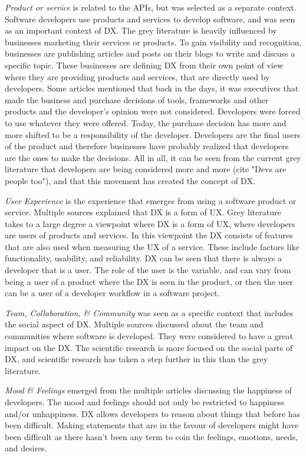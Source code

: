 \documentclass[english, 12pt, a4paper, sci, utf8, a-1b, online]{aaltothesis}
\begin{document}
\textit{Product or service} is related to the APIs, but was selected as a separate context. Software developers use products and services to develop software, and was seen as an important context of DX. The grey literature is heavily influenced by businesses marketing their services or products. To gain visibility and recognition, businesses are publishing articles and posts on their blogs to write and discuss a specific topic. These businesses are defining DX from their own point of view where they are providing products and services, that are directly used by developers. Some articles mentioned that back in the days, it was executives that made the business and purchase decisions of tools, frameworks and other products and the developer's opinion were not considered. Developers were forced to use whatever they were offered. Today, the purchase decision has more and more shifted to be a responsibility of the developer. Developers are the final users of the product and therefore businesses have probably realized that developers are the ones to make the decisions. All in all, it can be seen from the current grey literature that developers are being considered more and more (cite "Devs are people too"), and that this movement has created the concept of DX.

\textit{User Experience} is the experience that emerges from using a software product or service. Multiple sources explained that DX is a form of UX. Grey literature takes to a large degree a viewpoint where DX is a form of UX, where developers are users of products and services. In this viewpoint the DX consists of features that are also used when measuring the UX of a service. These include factors like functionality, usability, and reliability. DX can be seen that there is always a developer that is a user. The role of the user is the variable, and can vary from being a user of a product where the DX is seen in the product, or then the user can be a user of a developer workflow in a software project.

\textit{Team, Collaboration, \& Community} was seen as a specific context that includes the social aspect of DX. Multiple sources discussed about the team and communities where software is developed. They were considered to have a great impact on the DX. The scientific research is more focused on the social parts of DX, and scientific research has taken a step further in this than the grey literature.

\textit{Mood \& Feelings} emerged from the multiple articles discussing the happiness of developers. The mood and feelings should not only be restricted to happiness and/or unhappiness. DX allows developers to reason about things that before has been difficult. Making statements that are in the favour of developers might have been difficult as there hasn't been any term to coin the feelings, emotions, needs, and desires.
\end{document}
